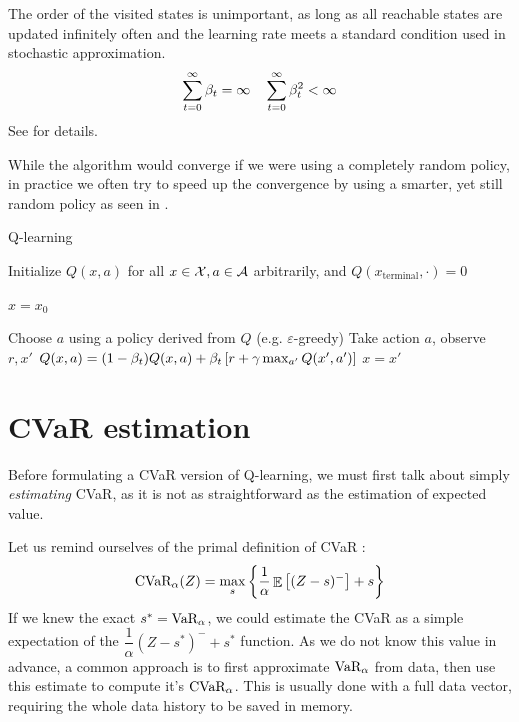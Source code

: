 The order of the visited states is unimportant, as long as all reachable states are updated infinitely often and the learning rate meets a standard condition used in stochastic approximation.
\begin{equation}\label{eqn:beta}
\sum_{t=0}^\infty \beta_t = \infty  \quad \sum_{t=0}^\infty \beta_t^2 < \infty\\
\end{equation}
See \citet{jaakkola1994convergence} for details.

While the algorithm would converge if we were using a completely random policy, in practice we often try to speed up the convergence by using a smarter, yet still random policy as seen in .


\begin{algorithm}
\caption{Q-learning}
\begin{algorithmic}\label{alg:qlearning}
    \STATE Initialize $Q(x, a)$ for all $x \in \mathcal{X}, a \in \mathcal{A}$ arbitrarily, and $Q(x_\text{terminal}, \cdot) = 0$
    
	
	\STATE $x = x_0$
	
	\STATE Choose $a$ using a policy derived from $Q$ (e.g. $\varepsilon$-greedy)
	\STATE Take action $a$, observe $r, x'$
	\STATE $Q(x, a) = (1-\beta_t)Q(x, a) + \beta_t\left[ {r + \gamma \max_{a'} Q(x', a')} \right]$
	\STATE $x = x'$	
	\ENDWHILE
	
	\ENDFOR
\end{algorithmic}
\end{algorithm}


\section{CVaR estimation}\label{sec:cvarestimation}

Before formulating a CVaR version of Q-learning, we must first talk about simply \emph{estimating} CVaR, as it is not as straightforward as the estimation of expected value.

Let us remind ourselves of the primal definition of CVaR :
\begin{equation*}
\text{CVaR}_\alpha(Z)=
\max_s\left\lbrace \dfrac{1}{\alpha}\mathop{\mathbb{E}}
\left[ (Z-s)^-\right] + s  \right\rbrace 
\end{equation*}
If we knew the exact $s^*=\text{VaR}_\alpha$, we could estimate the CVaR as a simple expectation of the $\dfrac{1}{\alpha}(Z-s^*)^-+s^*$ function. As we do not know this value in advance, a common approach is to first approximate $\text{VaR}_\alpha$ from data, then use this estimate to compute it's $\text{CVaR}_\alpha$. This is usually done with a full data vector, requiring the whole data history to be saved in memory.

